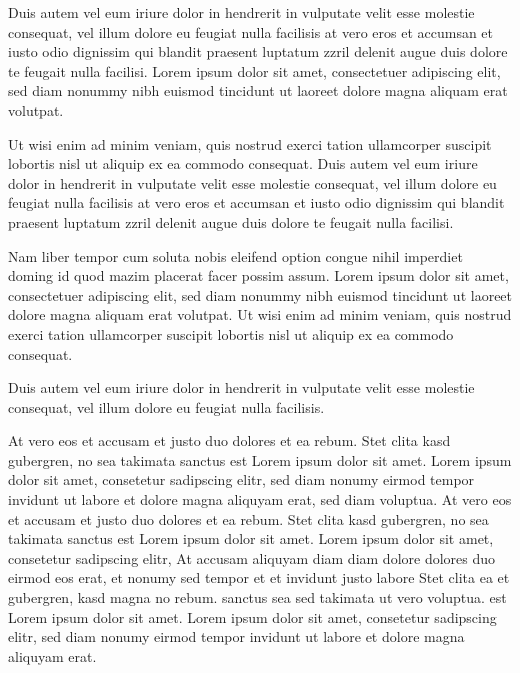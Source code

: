 Duis autem vel eum iriure dolor in hendrerit in vulputate velit esse molestie
consequat, vel illum dolore eu feugiat nulla facilisis at vero eros et accumsan
et iusto odio dignissim qui blandit praesent luptatum zzril delenit augue duis
dolore te feugait nulla facilisi. Lorem ipsum dolor sit amet, consectetuer
adipiscing elit, sed diam nonummy nibh euismod tincidunt ut laoreet dolore
magna aliquam erat volutpat.

Ut wisi enim ad minim veniam, quis nostrud exerci tation ullamcorper suscipit
lobortis nisl ut aliquip ex ea commodo consequat. Duis autem vel eum iriure
dolor in hendrerit in vulputate velit esse molestie consequat, vel illum dolore
eu feugiat nulla facilisis at vero eros et accumsan et iusto odio dignissim qui
blandit praesent luptatum zzril delenit augue duis dolore te feugait nulla
facilisi.

Nam liber tempor cum soluta nobis eleifend option congue nihil imperdiet doming
id quod mazim placerat facer possim assum. Lorem ipsum dolor sit amet,
consectetuer adipiscing elit, sed diam nonummy nibh euismod tincidunt ut laoreet
dolore magna aliquam erat volutpat. Ut wisi enim ad minim veniam, quis nostrud
exerci tation ullamcorper suscipit lobortis nisl ut aliquip ex ea commodo
consequat.

Duis autem vel eum iriure dolor in hendrerit in vulputate velit esse molestie
consequat, vel illum dolore eu feugiat nulla facilisis.

At vero eos et accusam et justo duo dolores et ea rebum. Stet clita kasd
gubergren, no sea takimata sanctus est Lorem ipsum dolor sit amet. Lorem ipsum
dolor sit amet, consetetur sadipscing elitr,  sed diam nonumy eirmod tempor
invidunt ut labore et dolore magna aliquyam erat, sed diam voluptua. At vero
eos et accusam et justo duo dolores et ea rebum. Stet clita kasd gubergren, no
sea takimata sanctus est Lorem ipsum dolor sit amet. Lorem ipsum dolor sit
amet, consetetur sadipscing elitr,  At accusam aliquyam diam diam dolore
dolores duo eirmod eos erat, et nonumy sed tempor et et invidunt justo labore
Stet clita ea et gubergren, kasd magna no rebum. sanctus sea sed takimata ut
vero voluptua. est Lorem ipsum dolor sit amet. Lorem ipsum dolor sit amet,
consetetur sadipscing elitr,  sed diam nonumy eirmod tempor invidunt ut labore
et dolore magna aliquyam erat. 


